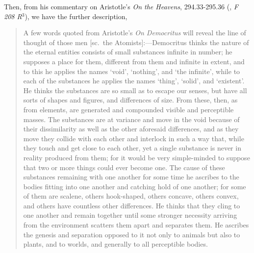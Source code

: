 Then, from his commentary on Aristotle's \textit{On the Heavens}, 294.33-295.36 (\cite{Aristotle1984}, \textit{F 208 R$^{3}$}), we have the further description,
\begin{quotation}
A few words quoted from Aristotle's \textit{On Democritus} will reveal the line of thought of those men [sc.~the Atomists]:---Democritus thinks the nature of the eternal entities consists of small substances infinite in number; he supposes a place for them, different from them and infinite in extent, and to this he applies the names `void', `nothing', and `the infinite', while to each of the substances he applies the names `thing', `solid', and `existent'. He thinks the substances are so small as to escape our senses, but have all sorts of shapes and figures, and differences of size. From these, then, as from elements, are generated and compounded visible and perceptible masses. The substances are at variance and move in the void because of their dissimilarity as well as the other aforesaid differences, and as they move they collide with each other and interlock in such a way that, while they touch and get close to each other, yet a single substance is never in reality produced from them; for it would be very simple-minded to suppose that two or more things could ever become one. The cause of these substances remaining with one another for some time he ascribes to the bodies fitting into one another and catching hold of one another; for some of them are scalene, others hook-shaped, others concave, others convex, and others have countless other differences. He thinks that they cling to one another and remain together until some stronger necessity arriving from the environment scatters them apart and separates them. He ascribes the genesis and separation opposed to it not only to animals but also to plants, and to worlds, and generally to all perceptible bodies.
\end{quotation}

